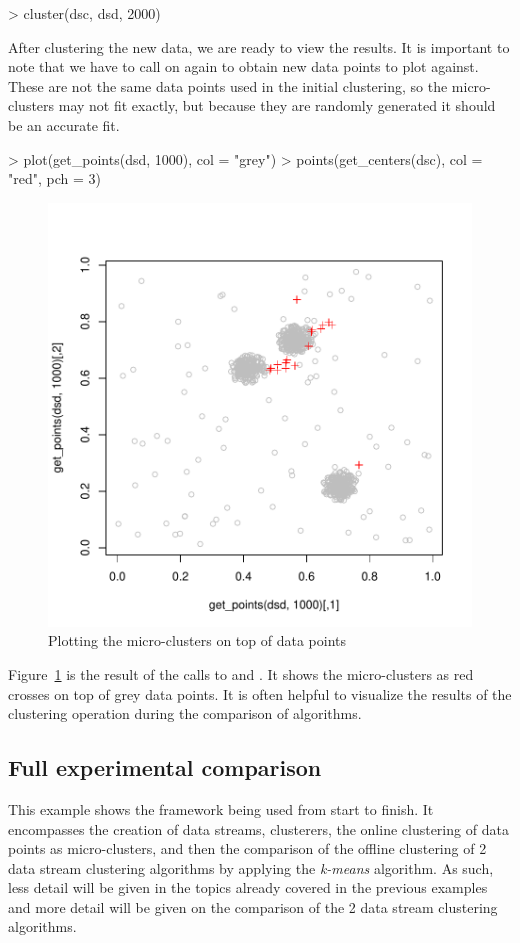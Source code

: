 \documentclass[nojss]{jss}
\begin{document}
\begin{Schunk}
\begin{Sinput}
> cluster(dsc, dsd, 2000)
\end{Sinput}
\end{Schunk}

After clustering the new data, we are ready to view the results. It is important to note that we have to call  on  again to obtain new data points to plot against. These are not the same data points used in the initial clustering, so the micro-clusters may not fit exactly, but because they are randomly generated it should be an accurate fit.

\begin{Schunk}
\begin{Sinput}
> plot(get_points(dsd, 1000), col = "grey")
> points(get_centers(dsc), col = "red", pch = 3)
\end{Sinput}
\end{Schunk}

\begin{figure}
\centering
\includegraphics[width=.5\linewidth]{stream-plot2}
\caption{Plotting the micro-clusters on top of data points}
\label{figure:plot2}
\end{figure}

Figure~\ref{figure:plot2} is the result of the calls to  and . It shows the micro-clusters as red crosses on top of grey data points. It is often helpful to visualize the results of the clustering operation during the comparison of algorithms.

\subsection{Full experimental comparison}
\label{examples:full}

This example shows the  framework being used from start to finish. It encompasses the creation of data streams, clusterers, the online clustering of data points as micro-clusters, and then the comparison of the offline clustering of 2 data stream clustering algorithms by applying the \textit{k-means} algorithm. As such, less detail will be given in the topics already covered in the previous examples and more detail will be given on the comparison of the 2 data stream clustering algorithms.
\end{document}
